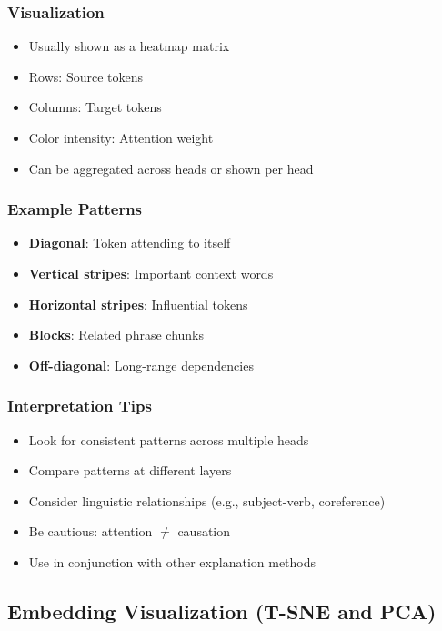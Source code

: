 \documentclass{article}
\begin{document}
\subsubsection{Visualization}
\begin{itemize}
    \item Usually shown as a heatmap matrix
    \item Rows: Source tokens
    \item Columns: Target tokens
    \item Color intensity: Attention weight
    \item Can be aggregated across heads or shown per head
\end{itemize}

\subsubsection{Example Patterns}
\begin{itemize}
    \item \textbf{Diagonal}: Token attending to itself
    \item \textbf{Vertical stripes}: Important context words
    \item \textbf{Horizontal stripes}: Influential tokens
    \item \textbf{Blocks}: Related phrase chunks
    \item \textbf{Off-diagonal}: Long-range dependencies
\end{itemize}

\subsubsection{Interpretation Tips}
\begin{itemize}
    \item Look for consistent patterns across multiple heads
    \item Compare patterns at different layers
    \item Consider linguistic relationships (e.g., subject-verb, coreference)
    \item Be cautious: attention $\neq$ causation
    \item Use in conjunction with other explanation methods
\end{itemize}

\subsection{Embedding Visualization (T-SNE and PCA)}
\end{document}
